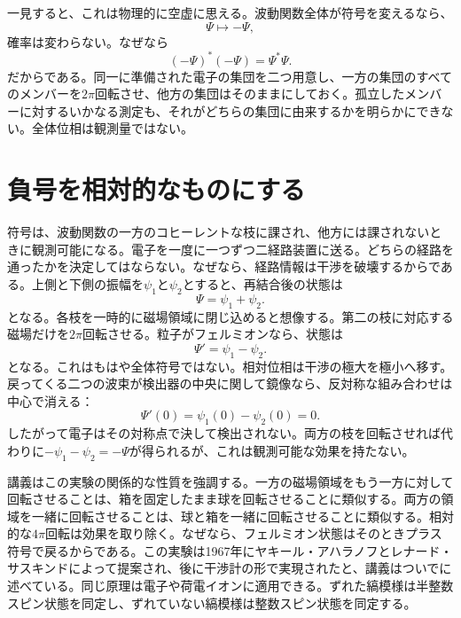 一見すると、これは物理的に空虚に思える。波動関数全体が符号を変えるなら、
\begin{equation}
\Psi\longmapsto-\Psi,
\end{equation}
確率は変わらない。なぜなら
\begin{equation}
(-\Psi)^*(-\Psi)=\Psi^*\Psi.
\end{equation}
だからである。同一に準備された電子の集団を二つ用意し、一方の集団のすべてのメンバーを\(2\pi\)回転させ、他方の集団はそのままにしておく。孤立したメンバーに対するいかなる測定も、それがどちらの集団に由来するかを明らかにできない。全体位相は観測量ではない。

\section{負号を相対的なものにする}

符号は、波動関数の一方のコヒーレントな枝に課され、他方には課されないときに観測可能になる。電子を一度に一つずつ二経路装置に送る。どちらの経路を通ったかを決定してはならない。なぜなら、経路情報は干渉を破壊するからである。上側と下側の振幅を\(\psi_1\)と\(\psi_2\)とすると、再結合後の状態は
\begin{equation}
\Psi=\psi_1+\psi_2.
\end{equation}
となる。各枝を一時的に磁場領域に閉じ込めると想像する。第二の枝に対応する磁場だけを\(2\pi\)回転させる。粒子がフェルミオンなら、状態は
\begin{equation}
\Psi'=\psi_1-\psi_2.
\end{equation}
となる。これはもはや全体符号ではない。相対位相は干渉の極大を極小へ移す。戻ってくる二つの波束が検出器の中央に関して鏡像なら、反対称な組み合わせは中心で消える：
\begin{equation}
\Psi'(0)=\psi_1(0)-\psi_2(0)=0.
\end{equation}
したがって電子はその対称点で決して検出されない。両方の枝を回転させれば代わりに\(-\psi_1-\psi_2=-\Psi\)が得られるが、これは観測可能な効果を持たない。

講義はこの実験の関係的な性質を強調する。一方の磁場領域をもう一方に対して回転させることは、箱を固定したまま球を回転させることに類似する。両方の領域を一緒に回転させることは、球と箱を一緒に回転させることに類似する。相対的な\(4\pi\)回転は効果を取り除く。なぜなら、フェルミオン状態はそのときプラス符号で戻るからである。この実験は1967年にヤキール・アハラノフとレナード・サスキンドによって提案され、後に干渉計の形で実現されたと、講義はついでに述べている。同じ原理は電子や荷電イオンに適用できる。ずれた縞模様は半整数スピン状態を同定し、ずれていない縞模様は整数スピン状態を同定する。

